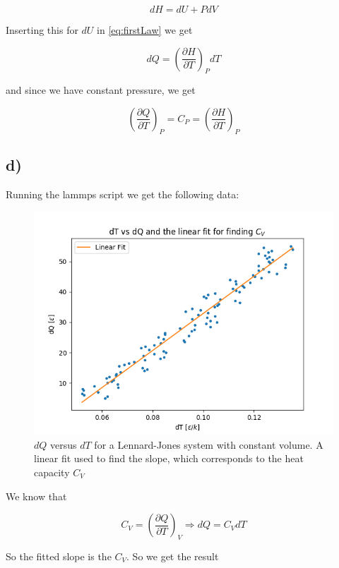 \documentclass[a4paper,norsk, 10pt]{article}
\newcommand{\pd}[2]{\frac{\partial #1}{\partial #2}}
\begin{document}
\begin{equation}
dH = dU + PdV
\end{equation}

Inserting this for $dU$ in \eqref{eq:firstLaw} we get

\begin{equation}
dQ = \left(\pd{H}{T}\right)_P dT
\end{equation}

and since we have constant pressure, we get

\begin{equation}
\left(\pd{Q}{T}\right)_P = C_P = \left(\pd{H}{T}\right)_P
\end{equation}

\subsection{d)}
Running the lammps script we get the following data:

\begin{figure}[H]
\centering
\includegraphics[scale=0.5]{dTdQ.png}
\caption{$dQ$ versus $dT$ for a Lennard-Jones system with constant volume. A linear fit used to find the slope, which corresponds to the heat capacity $C_V$}
\label{fig:isoTherm}
\end{figure}

We know that 

\begin{equation}
C_V = \left(\pd{Q}{T}\right)_V \Rightarrow dQ = C_VdT
\end{equation}

So the fitted slope is the $C_V$. So we get the result
\end{document}
